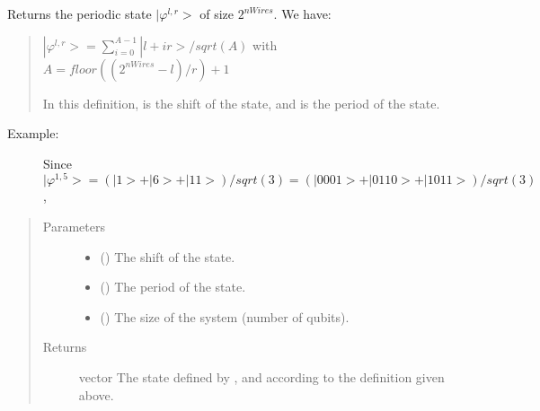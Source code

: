 \documentclass[letterpaper,10pt,english]{sphinxmanual}
\begin{document}
\begin{fulllineitems}
\label{\detokenize{qft:qft.periodic_state}}
Returns the periodic state \(|\varphi^{l,r}>\) of size \(2^{nWires}\). We have:
\begin{quote}

\(|\varphi^{l,r}> = \sum_{i=0}^{A-1}|l+ir>/sqrt(A)\) with
\(A = floor((2^{nWires}-l)/r)+1\)

In this definition,  is the shift of the state, and  is the period 
of the state.
\end{quote}
\begin{description}
\item[{Example:}] \leavevmode
Since
\(|\varphi^{1,5}> = (|1>+|6>+|11>)/sqrt(3)=(|0001>+|0110>+|1011>)/sqrt(3)\),

%
\begin{sphinxVerbatim}[commandchars=\\\{\},formatcom=\footnotesize]
\end{sphinxVerbatim}

\end{description}
\begin{quote}\begin{description}
\item[{Parameters}] \leavevmode\begin{itemize}
\item {} 
 () \textendash{} The shift of the state.

\item {} 
 () \textendash{} The period of the state.

\item {} 
 () \textendash{} The size of the system (number of qubits).

\end{itemize}

\item[{Returns}] \leavevmode
vector \textendash{} The state defined by ,  and  according
to the definition given above.

\end{description}\end{quote}

\end{fulllineitems}
\end{document}
